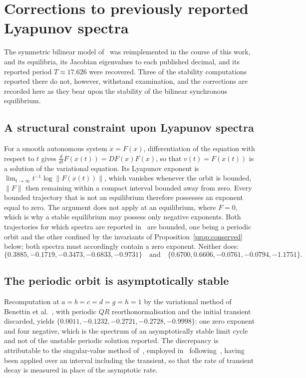 \documentclass[11pt]{article}
\theoremstyle{definition}
\theoremstyle{remark}
\begin{document}
	\appendix
	
	\section{Corrections to previously reported Lyapunov spectra}\label{app:corrections}
	
	The symmetric bilinear model of~\cite{Lin2020} was reimplemented in the course of
	this work, and its equilibria, its Jacobian eigenvalues to each published decimal,
	and its reported period $T\approx17.626$ were recovered. Three of the stability
	computations reported there do not, however, withstand examination, and the
	corrections are recorded here as they bear upon the stability of the bilinear
	synchronous equilibrium.
	
	\subsection*{A structural constraint upon Lyapunov spectra}
	
	For a smooth autonomous system $\dot x=F(x)$, differentiation of the equation with
	respect to $t$ gives $\tfrac{d}{dt}F(x(t))=DF(x)F(x)$, so that $v(t)=F(x(t))$ is a
	solution of the variational equation. Its Lyapunov exponent is
	$\lim_{t\to\infty}t^{-1}\log\|F(x(t))\|$, which vanishes whenever the orbit is
	bounded, $\|F\|$ then remaining within a compact interval bounded away from zero.
	Every bounded trajectory that is not an equilibrium therefore possesses an exponent
	equal to zero. The argument does not apply at an equilibrium, where $F=0$, which is
	why a stable equilibrium may possess only negative exponents. Both trajectories for
	which spectra are reported in~\cite{Lin2020} are bounded, one being a periodic orbit
	and the other confined by the invariants of Proposition~\ref{prop:conserved} below;
	both spectra must accordingly contain a zero exponent. Neither does:
	\[
	\{0.3885,-0.1719,-0.3473,-0.6833,-0.9731\}
	\quad\text{and}\quad
	\{0.6700,0.6606,-0.0761,-0.0794,-1.1751\}.
	\]
	
	\subsection*{The periodic orbit is asymptotically stable}
	
	Recomputation at $a=b=c=d=g=h=1$ by the variational method of Benettin et
	al.~\cite{Benettin1980a,Benettin1980b}, with periodic $QR$ reorthonormalisation and
	the initial transient discarded, yields
	$\{0.0011,-0.1232,-0.2721,-0.2728,-0.9998\}$: one zero exponent and four negative,
	which is the spectrum of an asymptotically stable limit cycle and not of the
	unstable periodic solution reported. The discrepancy is attributable to the
	singular-value method of~\cite{ZhangSVD2005}, employed in~\cite{Lin2020}
	following~\cite{Wolf1985}, having been applied over an interval including the
	transient, so that the rate of transient decay is measured in place of the
	asymptotic rate.
	
\end{document}
